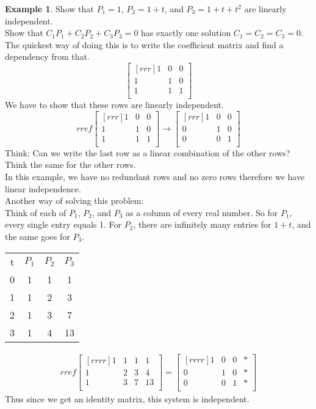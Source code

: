 \documentclass{report}
\theoremstyle{plain}
\theoremstyle{definition}
\newtheorem*{ex}{Example}
\theoremstyle{plain}
\begin{document}
\begin{ex}
Show that $P_1=1$, $P_2=1+t$, and $P_3=1+t+t^2$ are linearly independent.\\
Show that $C_1P_1+C_2P_2+C_3P_3=0$ has exactly one solution $C_1=C_2=C_3=0$.\\
The quickest way of doing this is to write the coefficient matrix and find a dependency from that.
\[ \begin{bmatrix}[rrr]1&0&0\\1&1&0\\1&1&1\\\end{bmatrix} \]
We have to show that these rows are linearly independent.\\
\[ rref\begin{bmatrix}[rrr]1&0&0\\1&1&0\\1&1&1\\\end{bmatrix} \rightarrow \begin{bmatrix}[rrr]1&0&0\\0&1&0\\0&0&1\\\end{bmatrix} \]
Think: Can we write the last row as a linear combination of the other rows? Think the same for the other rows.\\
In this example, we have no redundant rows and no zero rows therefore we have linear independence.\\
Another way of solving this problem:\\
Think of each of $P_1$, $P_2$, and $P_3$ as a column of every real number. So for $P_1$, every single entry equals 1. For $P_2$, there are infinitely many entries for $1+t$, and the same goes for $P_3$.\\
\begin{center}
\begin{tabular}{c|ccc}
t&$P_1$&$P_2$&$P_3$\\
0&1&1&1\\
1&1&2&3\\
2&1&3&7\\
3&1&4&13\\
\end{tabular}
\end{center}
\begin{align*}
rref\begin{bmatrix}[rrrr]1&1&1&1\\1&2&3&4\\1&3&7&13\\\end{bmatrix}
=\begin{bmatrix}[rrrr]1&0&0&*\\0&1&0&*\\0&0&1&*\\\end{bmatrix}
\end{align*}
Thus since we get an identity matrix, this system is independent.
\end{ex}
\end{document}
